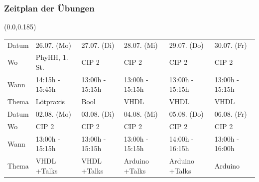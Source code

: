 \documentclass[aspectratio=169, 14pt]{beamer}
\begin{document}
\begin{frame}
    \frametitle{Zeitplan der Übungen}
    \begin{textblock*}{\paperwidth}(0.0\paperwidth,0.185\paperheight)
        {\fontsize{12}{10}\selectfont
        \begin{tabular}{L{0.10\paperwidth}|C{0.15\paperwidth}C{0.15\paperwidth}C{0.15\paperwidth}C{0.15\paperwidth}C{0.15\paperwidth}}
        \toprule
        \toprule
        Datum  & 26.07. (Mo)       & 27.07. (Di)          & 28.07. (Mi)        & 29.07. (Do)        & 30.07. (Fr) \\[2.0 mm]
        Wo     & PhyHH, 1. St.     & CIP 2                & CIP 2              & CIP 2              & CIP 2 \\[2.0 mm]
        Wann   & 14:15h - 15:45h   & 13:00h - 15:15h      & 13:00h - 15:15h    & 13:00h - 15:15h    & 13:00h - 15:15h \\[2.0 mm]
        Thema  & Lötpraxis         & Bool                 & VHDL               & VHDL               & VHDL \\
        \midrule
        \midrule
        Datum  & 02.08. (Mo)       & 03.08. (Di)          & 04.08. (Mi)        & 05.08. (Do)        & 06.08. (Fr) \\[2.0 mm]
        Wo     & CIP 2             & CIP 2                & CIP 2              & CIP 2              & CIP 2 \\[2.0 mm]
        Wann   & 13:00h - 15:15h   & 13:00h - 15:15h      & 13:00h - 15:15h    & 14:00h - 16:15h    & 13:00h - 16:00h \\[2.0 mm]
        Thema  & VHDL +Talks       & VHDL +Talks          & Arduino +Talks     & Arduino +Talks     & Arduino \\
        \bottomrule
        \bottomrule
        \end{tabular}
        }
    \end{textblock*}
    \framenumber
\end{frame}
\end{document}
